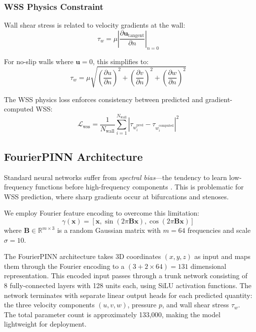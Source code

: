 \documentclass[12pt,a4paper]{article}
\newcommand{\wss}{\tau_w}
\begin{document}
\subsubsection{WSS Physics Constraint}
Wall shear stress is related to velocity gradients at the wall:
\begin{equation}
    \wss = \mu \left| \frac{\partial \mathbf{u}_{\text{tangent}}}{\partial n} \right|_{n=0}
\end{equation}

For no-slip walls where $\mathbf{u} = 0$, this simplifies to:
\begin{equation}
    \wss = \mu \sqrt{\left(\frac{\partial u}{\partial n}\right)^2 + \left(\frac{\partial v}{\partial n}\right)^2 + \left(\frac{\partial w}{\partial n}\right)^2}
\end{equation}

The WSS physics loss enforces consistency between predicted and gradient-computed WSS:
\begin{equation}
    \mathcal{L}_{\text{wss}} = \frac{1}{N_{\text{wall}}} \sum_{i=1}^{N_{\text{wall}}} \left| \wss_i^{\text{pred}} - \wss_i^{\text{computed}} \right|^2
\end{equation}

\subsection{FourierPINN Architecture}

Standard neural networks suffer from \textit{spectral bias}---the tendency to learn low-frequency functions before high-frequency components \cite{spectral_bias}. This is problematic for WSS prediction, where sharp gradients occur at bifurcations and stenoses.

We employ Fourier feature encoding \cite{tancik2020fourier} to overcome this limitation:
\begin{equation}
    \gamma(\mathbf{x}) = \left[ \mathbf{x}, \sin(2\pi \mathbf{B} \mathbf{x}), \cos(2\pi \mathbf{B} \mathbf{x}) \right]
\end{equation}
where $\mathbf{B} \in \mathbb{R}^{m \times 3}$ is a random Gaussian matrix with $m = 64$ frequencies and scale $\sigma = 10$.

The FourierPINN architecture takes 3D coordinates $(x, y, z)$ as input and maps them through the Fourier encoding to a $(3 + 2 \times 64) = 131$ dimensional representation. This encoded input passes through a trunk network consisting of 8 fully-connected layers with 128 units each, using SiLU activation functions. The network terminates with separate linear output heads for each predicted quantity: the three velocity components $(u, v, w)$, pressure $p$, and wall shear stress $\wss$. The total parameter count is approximately 133,000, making the model lightweight for deployment.
\end{document}
